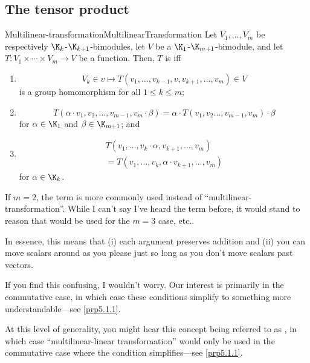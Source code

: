 \subsection{The tensor product}

\begin{dfn}{Multilinear-transformation\hfill}{MultilinearTransformation}
	Let $V_1,\ldots ,V_m$ be respectively $\K _k$-$\K _{k+1}$-bimodules, let $V$ be a $\K _1$-$\K _{m+1}$-bimodule, and let $T\colon V_1\times \cdots \times V_m\rightarrow V$ be a function.  Then, $T$ is  iff
	\begin{enumerate}
		\item
		\begin{equation*}
		V_k\in v\mapsto T(v_1,\ldots ,v_{k-1},v,v_{k+1},\ldots ,v_m)\in V
		\end{equation*}
		is a group homomorphism for all $1\leq k\leq m$;
		\item
		\begin{equation*}
		T(\alpha \cdot v_1,v_2,\ldots ,v_{m-1},v_m\cdot \beta )=\alpha \cdot T(v_1,v_2\ldots ,v_{m-1},v_m)\cdot \beta
		\end{equation*}
		for $\alpha \in \K _1$ and $\beta \in \K _{m+1}$; and
		\item
		\begin{equation}
		\begin{multlined}
		T(v_1,\ldots ,v_k\cdot \alpha ,v_{k+1},\ldots ,v_m) \\ =T(v_1,\ldots ,v_k,\alpha \cdot v_{k+1},\ldots ,v_m)
		\end{multlined}
		\end{equation}
		for $\alpha \in \K _k$.
	\end{enumerate}
	\begin{rmk}
		If $m=2$, the term  is more commonly used instead of ``multilinear-transformation''.  While I can't say I've heard the term before, it would stand to reason that  would be used for the $m=3$ case, etc..
	\end{rmk}
	\begin{rmk}
		In essence, this means that (i) each argument preserves addition and (ii) you can move scalars around as you please just so long as you don't move scalars past vectors.
		
		If you find this confusing, I wouldn't worry.  Our interest is primarily in the commutative case, in which case these conditions simplify to something more understandable---see \cref{prp5.1.1}.
	\end{rmk}
	\begin{rmk}
		At this level of generality, you might hear this concept being referred to as , in which case ``multilinear-linear transformation'' would only be used in the commutative case where the condition simplifies---see \cref{prp5.1.1}.
	\end{rmk}
\end{dfn}

